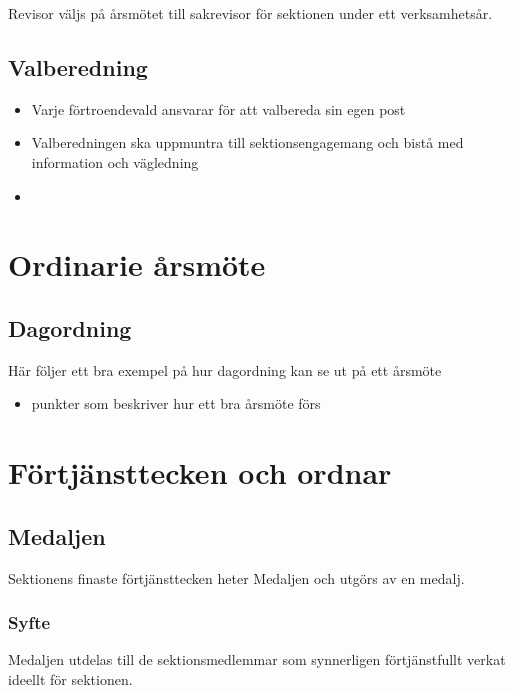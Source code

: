 \documentclass{../resources/dgovdoc}
\begin{document}
Revisor väljs på årsmötet till sakrevisor för sektionen under ett verksamhetsår.

\subsection{Valberedning}

\begin{itemize}

\item Varje förtroendevald ansvarar för att valbereda sin egen post
\item Valberedningen ska uppmuntra till sektionsengagemang och bistå med information och vägledning
\item 

\end{itemize}

\section{Ordinarie årsmöte}

\subsection{Dagordning}

Här följer ett bra exempel på hur dagordning kan se ut på ett årsmöte

\begin{itemize}
\item punkter som beskriver hur ett bra årsmöte förs
\end{itemize}

\section{Förtjänsttecken och ordnar}

\subsection{Medaljen}

Sektionens finaste förtjänsttecken heter Medaljen och utgörs av en medalj. 

\subsubsection{Syfte}

Medaljen utdelas till de sektionsmedlemmar som synnerligen förtjänstfullt verkat ideellt för sektionen. 
\end{document}

